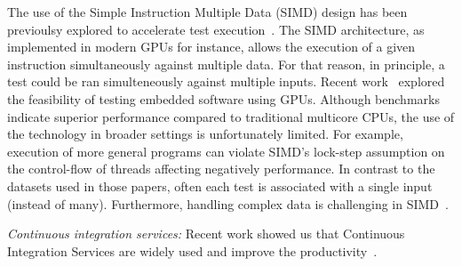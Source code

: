 The use of the Simple Instruction Multiple Data (SIMD) design has been
previoulsy explored to accelerate test
execution~\cite{damorim-etal-issta2007,damorim-etal-tse2008,kim-etal-issre2012,nguyen-etal-icse2014,rajan-etal-ase2014,sen-etal-fse2015,yaneva-etal-issta2017}. The
SIMD architecture, as implemented in modern GPUs for instance, allows
the execution of a given instruction simultaneously against multiple
data.  For that reason, in principle, a test could be ran
simulteneously against multiple inputs.  Recent
work~\cite{rajan-etal-ase2014,yaneva-etal-issta2017} explored the
feasibility of testing embedded software using GPUs.  Although
benchmarks indicate superior performance compared to traditional
multicore CPUs, the use of the technology in broader settings is
unfortunately limited. For example, execution of more general programs
can violate SIMD's lock-step assumption on the control-flow of threads
affecting negatively performance. In contrast to the datasets used in
those papers, often each test is associated with a single input
(instead of many).  Furthermore, handling complex data is challenging
in SIMD~\cite{damorim-etal-issta2007,damorim-etal-tse2008}.




\textit{Continuous integration services:}
Recent work showed us that Continuous Integration Services are widely
used and improve the productivity~. 


